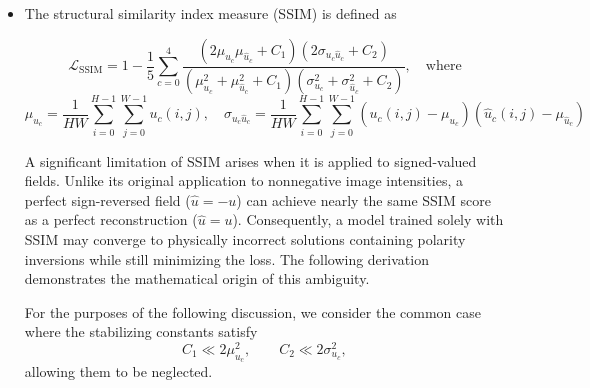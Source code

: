 \documentclass[preprint,review,12pt,numafflabel]{elsarticle}
\begin{document}
\begin{itemize}
Experimentally, this training schedule consistently outperformed training with either MAE or MSE alone for the same total number of epochs. The resulting predictions retained substantially sharper boundaries than models trained exclusively with MSE, while achieving lower validation MAE and MSE than models trained exclusively with MAE. Among the non-Huber training strategies investigated, the hybrid schedule produced the best overall balance between qualitative feature preservation and quantitative accuracy, converging to within approximately 10\% of the validation error achieved by Huber loss. Although less adaptive than Huber, which transitions between MAE- and MSE-like behavior on a per-residual basis, the epoch-wise transition captures much of the same optimization benefit.

\item The structural similarity index measure (SSIM) is defined as

\begin{equation*}
\mathcal{L}_{\text{SSIM}}
=
1
-
\frac{1}{5}
\sum_{c=0}^{4}
\frac{
\left(2\mu_{u_c}\mu_{\hat{u}_c}+C_1\right)\left(2\sigma_{u_c\hat{u}_c}+C_2\right)
}{
\left(\mu_{u_c}^2+\mu_{\hat{u}_c}^2+C_1\right)\left(\sigma_{u_c}^2+\sigma_{\hat{u}_c}^2+C_2\right)
}, \quad \text{where}
\end{equation*}
\begin{equation*}
\mu_{u_c}=\frac{1}{HW}\sum_{i=0}^{H-1}\sum_{j=0}^{W-1}u_c(i,j), \quad
\sigma_{u_c\hat{u}_c}=\frac{1}{HW}\sum_{i=0}^{H-1}\sum_{j=0}^{W-1}\left(u_c(i,j)-\mu_{u_c}\right)\left(\hat{u}_c(i,j)-\mu_{\hat{u}_c}\right)
\end{equation*}

A significant limitation of SSIM arises when it is applied to signed-valued fields. Unlike its original application to nonnegative image intensities, a perfect sign-reversed field ($\hat{u}=-u$) can achieve nearly the same SSIM score as a perfect reconstruction ($\hat{u}=u$). Consequently, a model trained solely with SSIM may converge to physically incorrect solutions containing polarity inversions while still minimizing the loss. The following derivation demonstrates the mathematical origin of this ambiguity.

For the purposes of the following discussion, we consider the common case where the stabilizing constants satisfy
\begin{equation*}
    C_1 \ll 2\mu_{u_c}^2,
    \qquad
    C_2 \ll 2\sigma_{u_c}^2,
\end{equation*}
allowing them to be neglected.


\end{itemize}
\end{document}
